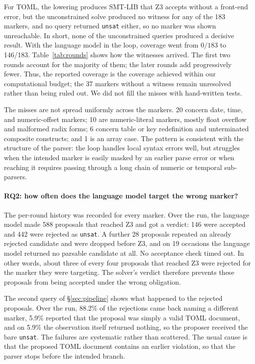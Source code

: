 \documentclass[sigconf,screen]{acmart}
\theoremstyle{definition}
\theoremstyle{remark}
\newcommand{\toml}{TOML}
\newcommand{\code}[1]{\texttt{#1}}
\newcommand{\markers}{183}       %
\newcommand{\certcount}{146}    %
\newcommand{\misscount}{37}    %
\newcommand{\decided}{588}      %
\newcommand{\acceptcount}{146}  %
\newcommand{\rejectcount}{442}  %
\newcommand{\dupcount}{28}     %
\newcommand{\nocandcount}{19}  %
\newcommand{\missdate}{20}
\newcommand{\missnum}{10}
\newcommand{\misstable}{6}
\newcommand{\missarray}{1}
\newcommand{\cexnamed}{88.2}    %
\newcommand{\cexvalid}{5.9}    %
\newcommand{\cexnone}{5.9}     %
\begin{document}
For \toml{}, the lowering produces SMT-LIB that Z3 accepts without a front-end
error, but the unconstrained solve produced no witness for any of the
\markers{} markers, and no query
returned \code{unsat} either, so no marker was shown unreachable. In short, none of the unconstrained queries produced a decisive result. With the language model in the loop, coverage went from $0/\markers{}$ to
\certcount{}/\markers{}. Table~\ref{tab:rounds} shows how the witnesses arrived.
The first two rounds account for the majority of them; the later rounds add
progressively fewer. Thus, the reported coverage is the coverage achieved within our computational budget; the \misscount{} markers without a witness remain unresolved rather than being ruled out. We did not fill the misses with hand-written tests.

The misses are not spread uniformly across the markers. \missdate{} concern date, time, and numeric-offset markers; \missnum{} are numeric-literal markers, mostly float overflow and malformed radix forms; \misstable{} concern table or key redefinition and unterminated composite constructs; and \missarray{} is an array case. The pattern is consistent with the structure of the parser: the loop handles local syntax errors well, but struggles when the intended marker is easily masked by an earlier parse error or when reaching it requires passing through a long chain of numeric or temporal sub-parsers.

\paragraph{RQ2: how often does the language model target the wrong marker?}
The per-round history was recorded for every marker. Over the run, the language model
made \decided{} proposals that reached Z3 and got a verdict: \acceptcount{}
were accepted and \rejectcount{} were rejected as \code{unsat}. A further
\dupcount{} proposals repeated an already rejected candidate and were dropped
before Z3, and on \nocandcount{} occasions the language model returned no parsable
candidate at all. No acceptance check timed out. In other words, about three of every four proposals that reached Z3 were rejected for the marker they were targeting. The solver's verdict therefore prevents these proposals from being accepted under the wrong obligation.

The second query of \S\ref{sec:pipeline} shows what happened to the rejected proposals. Over
the run, \cexnamed{}\% of the rejections came back naming a different marker, \cexvalid{}\% reported that the proposal was
simply a valid TOML document, and on \cexnone{}\% the observation itself returned nothing, so
the proposer received the bare \code{unsat}. The
failures are systematic rather than scattered. The usual cause is that the
proposed TOML document contains an earlier violation, so that the parser stops before
the intended branch.
\end{document}
